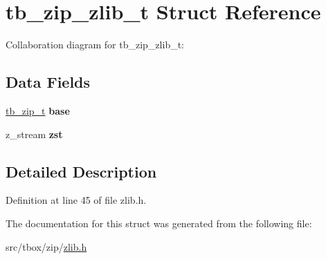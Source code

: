 \hypertarget{structtb__zip__zlib__t}{\section{tb\-\_\-zip\-\_\-zlib\-\_\-t Struct Reference}
\label{structtb__zip__zlib__t}
}


Collaboration diagram for tb\-\_\-zip\-\_\-zlib\-\_\-t\-:
\subsection*{Data Fields}
\begin{DoxyCompactItemize}
\item 
\hypertarget{structtb__zip__zlib__t_a296d3c86ea2800d364f29d43a6956eaa}{\hyperlink{structtb__zip__t}{tb\-\_\-zip\-\_\-t} {\bfseries base}}\label{structtb__zip__zlib__t_a296d3c86ea2800d364f29d43a6956eaa}

\item 
\hypertarget{structtb__zip__zlib__t_a98e8ceb9b0568b91caf4f6eb305bef98}{z\-\_\-stream {\bfseries zst}}\label{structtb__zip__zlib__t_a98e8ceb9b0568b91caf4f6eb305bef98}

\end{DoxyCompactItemize}


\subsection{Detailed Description}


Definition at line 45 of file zlib.\-h.



The documentation for this struct was generated from the following file\-:\begin{DoxyCompactItemize}
\item 
src/tbox/zip/\hyperlink{zlib_8h}{zlib.\-h}\end{DoxyCompactItemize}
